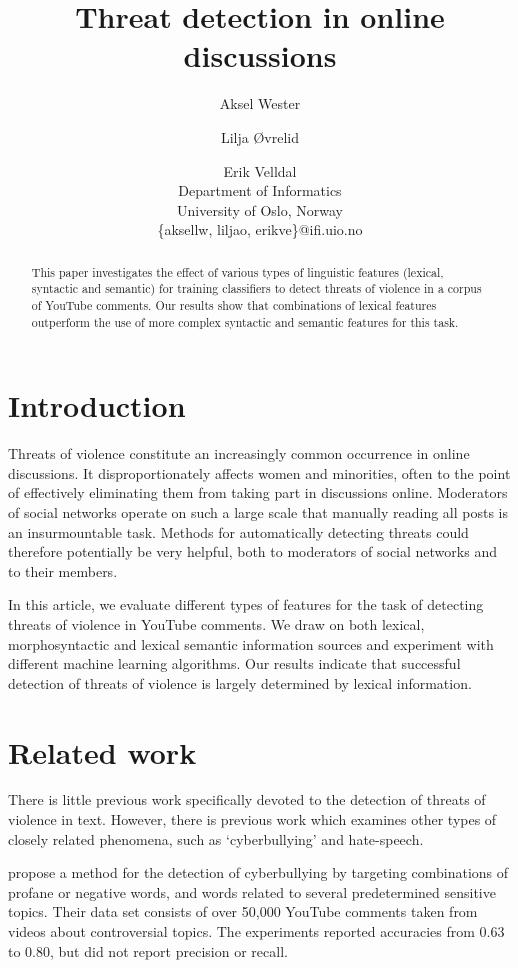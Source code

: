 \documentclass[11pt,letterpaper]{article}
\title{Threat detection in online discussions}
\author{Aksel Wester \and Lilja Øvrelid \and Erik Velldal \\
  Department of Informatics \\
  University of Oslo, Norway \\
  \{aksellw, liljao, erikve\}@ifi.uio.no}
\date{}
\begin{document}
\maketitle

\begin{abstract}
This paper investigates the effect of various types of linguistic features (lexical, syntactic and semantic) for training classifiers to detect threats of violence in a corpus of YouTube comments. %
Our results show that combinations of lexical features outperform the use of more complex syntactic and semantic features for this task.
\end{abstract}

\section{Introduction}
\label{sec:intro}
Threats of violence constitute an increasingly common occurrence in online discussions. It disproportionately affects women and minorities, often to the point of effectively eliminating them from taking part in discussions online. Moderators of social networks operate on such a large scale that manually reading all posts is an insurmountable task. Methods for automatically detecting threats could therefore potentially be very helpful, both to moderators of social networks and to their members.

In this article, we evaluate different types of features for the task of detecting threats of violence in YouTube comments. We draw on both lexical, morphosyntactic and lexical semantic information sources and experiment with different machine learning algorithms. Our results indicate that successful detection of threats of violence is largely determined by lexical information.

\section{Related work}
\label{sec:prev}
There is little previous work specifically devoted to the detection of threats of violence in text. However, there is previous work which examines other types of closely related phenomena, such as `cyberbullying' and hate-speech.

 propose a method for the detection of cyberbullying by targeting combinations of profane or negative words, and words related to several predetermined sensitive topics. Their data set consists of over 50,000 YouTube comments taken from videos about controversial topics. %
The experiments reported accuracies from 0.63 to 0.80, but did not report precision or recall.
\end{document}
